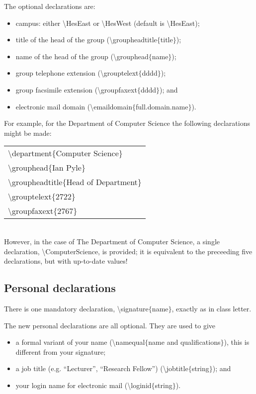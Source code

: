 \documentclass[12pt,a4paper]{article}
\newcommand{\cmdsty}[1]{\textsf{#1}}
\newcommand{\cmd}[1]{\cmdsty{\textbackslash#1}}
\newcommand{\pcmd}[2]{\cmdsty{\cmd{#1}$\{$#2$\}$}}
\begin{document}
The optional declarations are:
\begin{itemize}
\item campus: either \cmd{HesEast} or \cmd{HesWest} (default is
  \cmd{HesEast});
\item title of the head of the group (\pcmd{groupheadtitle}{title});
\item name of the head of the group (\pcmd{grouphead}{name});
\item group telephone extension (\pcmd{grouptelext}{dddd});
\item group facsimile extension (\pcmd{groupfaxext}{dddd}); and
\item electronic mail domain (\pcmd{emaildomain}{full.domain.name}).
\end{itemize}

For example, for the Department of Computer Science the following
declarations might be made:\\
\hspace*{1cm}\begin{tabular}[t]{l}
\pcmd{department}{Computer Science}\\
\pcmd{grouphead}{Ian Pyle}\\
\pcmd{groupheadtitle}{Head of Department}\\
\pcmd{grouptelext}{2722}\\
\pcmd{groupfaxext}{2767}
\end{tabular}\\
However, in the case of The Department of Computer Science, a single
declaration, \cmd{ComputerScience}, is provided; it is equivalent to
the preceeding five declarations, but with up-to-date values!

\subsection{Personal declarations}\label{PerDec:SS}

There is one mandatory declaration, \pcmd{signature}{name}, exactly as
in class \cmdsty{letter}.

The new personal declarations are all optional.  They are used to give
\begin{itemize}
\item a formal variant of your name (\pcmd{namequal}{name and
qualifications}), this is different from your signature;
\item a job title (e.g. ``Lecturer'', ``Research Fellow'')
(\pcmd{jobtitle}{string}); and
\item your login name for electronic mail (\pcmd{loginid}{string}).
\end{itemize}
\end{document}
